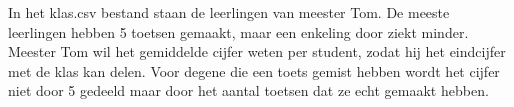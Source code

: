 In het klas.csv bestand staan de leerlingen van meester Tom. De meeste leerlingen hebben 5 toetsen gemaakt, maar een enkeling door ziekt minder. Meester Tom wil het gemiddelde cijfer weten per student, zodat hij het eindcijfer met de klas kan delen. Voor degene die een toets gemist hebben wordt het cijfer niet door 5 gedeeld maar door het aantal toetsen dat ze echt gemaakt hebben.
